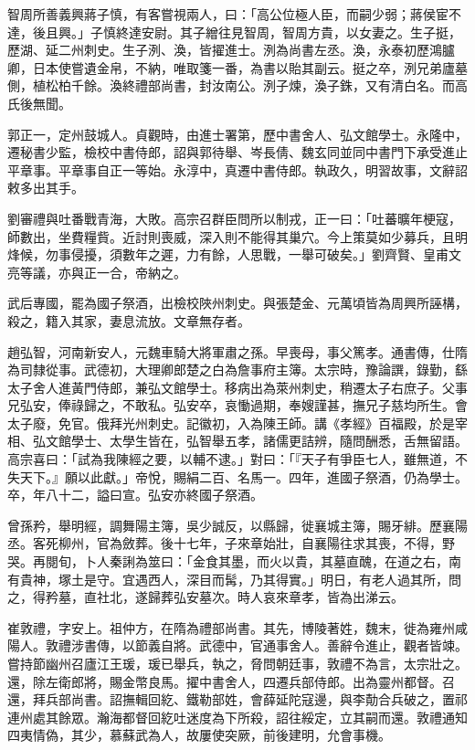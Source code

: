 \begin{pinyinscope}
 智周所善義興蔣子慎，有客嘗視兩人，曰：「高公位極人臣，而嗣少弱；蔣侯宦不達，後且興。」子慎終達安尉。其子繒往見智周，智周方貴，以女妻之。生子挺，歷湖、延二州刺史。生子洌、渙，皆擢進士。洌為尚書左丞。渙，永泰初歷鴻臚卿，日本使嘗遺金帛，不納，唯取箋一番，為書以貽其副云。挺之卒，洌兄弟廬墓側，植松柏千餘。渙終禮部尚書，封汝南公。洌子煉，渙子銖，又有清白名。而高氏後無聞。



 郭正一，定州鼓城人。貞觀時，由進士署第，歷中書舍人、弘文館學士。永隆中，遷秘書少監，檢校中書侍郎，詔與郭待舉、岑長倩、魏玄同並同中書門下承受進止平章事。平章事自正一等始。永淳中，真遷中書侍郎。執政久，明習故事，文辭詔敕多出其手。



 劉審禮與吐番戰青海，大敗。高宗召群臣問所以制戎，正一曰：「吐蕃曠年梗寇，師數出，坐費糧貲。近討則喪威，深入則不能得其巢穴。今上策莫如少募兵，且明烽候，勿事侵擾，須數年之遲，力有餘，人思戰，一舉可破矣。」劉齊賢、皇甫文亮等議，亦與正一合，帝納之。



 武后專國，罷為國子祭酒，出檢校陜州刺史。與張楚金、元萬頃皆為周興所誣構，殺之，籍入其家，妻息流放。文章無存者。



 趙弘智，河南新安人，元魏車騎大將軍肅之孫。早喪母，事父篤孝。通書傳，仕隋為司隸從事。武德初，大理卿郎楚之白為詹事府主簿。太宗時，豫論譔，錄勤，繇太子舍人進黃門侍郎，兼弘文館學士。移病出為萊州刺史，稍遷太子右庶子。父事兄弘安，俸祿歸之，不敢私。弘安卒，哀慟過期，奉嫂謹甚，撫兄子慈均所生。會太子廢，免官。俄拜光州刺史。記徽初，入為陳王師。講《孝經》百福殿，於是宰相、弘文館學士、太學生皆在，弘智舉五孝，諸儒更詰辨，隨問酬悉，舌無留語。高宗喜曰：「試為我陳經之要，以輔不逮。」對曰：「『天子有爭臣七人，雖無道，不失天下。』願以此獻。」帝悅，賜絹二百、名馬一。四年，進國子祭酒，仍為學士。卒，年八十二，謚曰宣。弘安亦終國子祭酒。



 曾孫矜，舉明經，調舞陽主簿，吳少誠反，以縣歸，徙襄城主簿，賜牙緋。歷襄陽丞。客死柳州，官為斂葬。後十七年，子來章始壯，自襄陽往求其喪，不得，野哭。再閱旬，卜人秦誗為筮曰：「金食其墨，而火以貴，其墓直醜，在道之右，南有貴神，塚土是守。宜遇西人，深目而髯，乃其得實。」明日，有老人過其所，問之，得矜墓，直社北，遂歸葬弘安墓次。時人哀來章孝，皆為出涕云。



 崔敦禮，字安上。祖仲方，在隋為禮部尚書。其先，博陵著姓，魏末，徙為雍州咸陽人。敦禮涉書傳，以節義自將。武德中，官通事舍人。善辭令進止，觀者皆竦。嘗持節幽州召廬江王瑗，瑗已舉兵，執之，脅問朝廷事，敦禮不為言，太宗壯之。還，除左衛郎將，賜金幣良馬。擢中書舍人，四遷兵部侍郎。出為靈州都督。召還，拜兵部尚書。詔撫輯回紇、鐵勒部姓，會薛延陀寇邊，與李勣合兵破之，置祁連州處其餘眾。瀚海都督回紇吐迷度為下所殺，詔往綏定，立其嗣而還。敦禮通知四夷情偽，其少，慕蘇武為人，故屢使突厥，前後建明，允會事機。




\end{pinyinscope}
